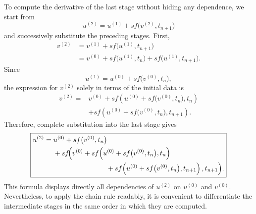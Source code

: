 \documentclass[11pt,a4paper]{article}
\begin{document}
To compute the derivative of the last stage without hiding any dependence, we start from
\[
 u^{(2)}=u^{(1)}+s f\bigl(v^{(2)},t_{n+1}\bigr)
\]
and successively substitute the preceding stages. First,
\begin{align*}
 v^{(2)}
 &=v^{(1)}+s f\bigl(u^{(1)},t_{n+1}\bigr)\\
 &=v^{(0)}+s f\bigl(u^{(1)},t_n\bigr)
   +s f\bigl(u^{(1)},t_{n+1}\bigr).
\end{align*}
Since
\[
 u^{(1)}=u^{(0)}+s f\bigl(v^{(0)},t_n\bigr),
\]
the expression for $v^{(2)}$ solely in terms of the initial data is
\[
 \begin{aligned}
 v^{(2)}={}&v^{(0)}
 +s f\!\left(u^{(0)}+s f\bigl(v^{(0)},t_n\bigr),t_n\right)\\
 &+s f\!\left(u^{(0)}+s f\bigl(v^{(0)},t_n\bigr),t_{n+1}\right).
 \end{aligned}
\]
Therefore, complete substitution into the last stage gives
\[
 \boxed{
 \begin{aligned}
 u^{(2)}={}&u^{(0)}+s f\bigl(v^{(0)},t_n\bigr)\\
 &+s f\!\Bigl(
 v^{(0)}
 +s f\!\left(u^{(0)}+s f\bigl(v^{(0)},t_n\bigr),t_n\right)\\
 &\hspace{2.7cm}
 +s f\!\left(u^{(0)}+s f\bigl(v^{(0)},t_n\bigr),t_{n+1}\right),
 t_{n+1}\Bigr).
 \end{aligned}
 }
\]
This formula displays directly all dependencies of $u^{(2)}$ on $u^{(0)}$ and $v^{(0)}$.
Nevertheless, to apply the chain rule readably, it is convenient to differentiate the
intermediate stages in the same order in which they are computed.
\end{document}
